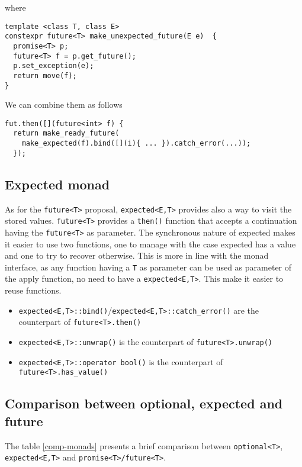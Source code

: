 \documentclass[a4paper,10pt]{article}
\newcommand{\cpp}[1]{\lstinline{#1}}
\begin{document}
where

\begin{lstlisting}
template <class T, class E>
constexpr future<T> make_unexpected_future(E e)  {
  promise<T> p;
  future<T> f = p.get_future();
  p.set_exception(e);
  return move(f);
}
\end{lstlisting}

We can combine them as follows

\begin{lstlisting}
fut.then([](future<int> f) { 
  return make_ready_future(
    make_expected(f).bind([](i){ ... }).catch_error(...));
  });
\end{lstlisting}

\subsection{Expected monad}

As for the \cpp{future<T>} proposal, \cpp{expected<E,T>} provides also a way to visit the stored values.
\cpp{future<T>} provides a \cpp{then()} function that accepts a continuation having the \cpp{future<T>} as parameter. The synchronous nature of expected makes it easier to use two functions, one to manage with the case expected has a value and one to try to recover otherwise. This is more in line with the monad interface, as any function having a \cpp{T} as parameter can be used as parameter of the apply function, no need to have a \cpp{expected<E,T>}. This make it easier to reuse functions. 

\begin{itemize}
 \item \cpp{expected<E,T>::bind()}/\cpp{expected<E,T>::catch_error()} are the counterpart of \cpp{future<T>.then()}
 \item \cpp{expected<E,T>::unwrap()} is the counterpart of \cpp{future<T>.unwrap()}
 \item \cpp{expected<E,T>::operator bool()} is the counterpart of \cpp{future<T>.has_value()}
\end{itemize}

\subsection{Comparison between optional, expected and future}

The table \ref{comp-monads} presents a brief comparison between \cpp{optional<T>}, \cpp{expected<E,T>}  and \cpp{promise<T>/future<T>}.
\end{document}

